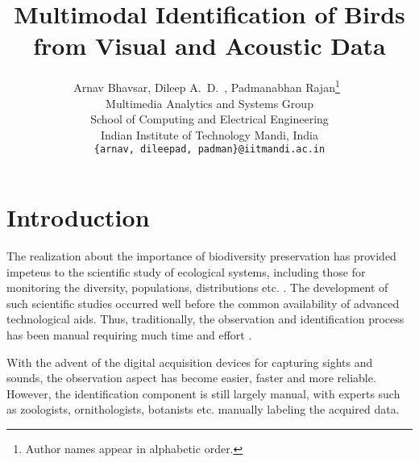 \documentclass{article}
\begin{document}
\title{Multimodal Identification of Birds from Visual and Acoustic Data}
\author{Arnav Bhavsar, Dileep A.~D.~, Padmanabhan Rajan\footnote{Author names
appear in alphabetic order.}\  \\Multimedia Analytics and Systems Group \\ 
School of Computing and Electrical Engineering\\
Indian Institute of Technology Mandi, India\\
\texttt{\{arnav, dileepad, padman\}@iitmandi.ac.in}}

\date{}
\maketitle

\section{Introduction}






The realization about the importance of biodiversity preservation has provided impeteus to the scientific study of ecological systems, including those for monitoring the diversity, populations, distributions etc. \cite{monitor1,monitor2,monitor3,monitor4}. %
The development of such scientific studies occurred well before the common availability of advanced technological aids. Thus, traditionally, the observation and identification process has been manual requiring much time and effort \cite{monitor4,human1,human2}. 

With the advent of the digital acquisition devices for capturing sights and sounds, the observation aspect has become easier, faster and more reliable. However, the identification component is still largely manual, with experts such as zoologists, ornithologists, botanists etc. manually labeling the acquired data. 
\end{document}
